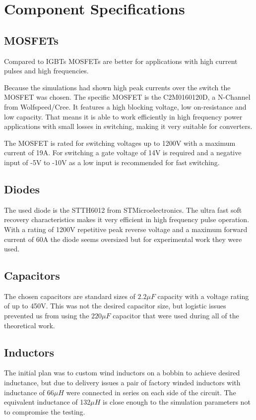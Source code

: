 \vspace{-8mm}
\section{Component Specifications}\label{ch:compSpec}
\vspace{-2mm}
\subsection{MOSFETs}
\vspace{-2mm}
Compared to IGBTs MOSFETs are better for applications with high current pulses and high frequencies.\cite{igbtelec63:online}

Because the simulations had shown high peak currents over the switch the MOSFET was chosen.
The specific MOSFET is the C2M0160120D, a N-Channel from Wolfspeed/Cree. 
It features a high blocking voltage, low on-resistance and low capacity.
That means it is able to work efficiently in high frequency power applications with small losses in switching, making it very suitable for converters.

The MOSFET is rated for switching voltages up to 1200V with a maximum current of 19A.
For switching a gate voltage of 14V is required and a negative input of -5V to -10V as a low input is recommended for fast switching.\cite{CreeC2M082:online}
\vspace{-4mm}
\subsection{Diodes}
\vspace{-2mm}
The used diode is the STTH6012 from STMicroelectronics.
The ultra fast soft recovery characteristics makes it very efficient in high frequency pulse operation.
With a rating of 1200V repetitive peak reverse voltage and a maximum forward current of 60A the diode seems oversized but for experimental work they were used.\cite{ST}
\vspace{-4mm}
\subsection{Capacitors}
\vspace{-2mm}
The chosen capacitors are standard sizes of $2.2 \mu F$ capacity with a voltage rating of up to 450V. This was not the desired capacitor size, but logistic issues prevented us from using the $220 \mu F$ capacitor that were used during all of the theoretical work.
\vspace{-4mm}
\subsection{Inductors}
The initial plan was to custom wind inductors on a bobbin to achieve desired inductance, but due to delivery issues a pair of factory winded inductors with inductance of 66$\mu H$ were connected in series on each side of the circuit. The equivalent inductance of 132$\mu H$ is close enough to the simulation parameters not to compromise the testing.